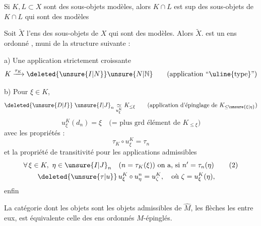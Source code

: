 Si $K,L\subset X$ sont des sous-objets modèles, alors $K\cap L$ est sup des sous-objets de $K\cap L$ qui sont des modèles

Soit  $\widetilde X$ l'ens des  sous-objets de $X$ qui sont des modèles. Alors $\widetilde X$. est un ens ordonné , muni de la structure suivante  : 

a)  Une application strictement croissante
\[
K\xrightarrow{\tau_K}\deleted{\unsure{I|N}}\unsure{N|\mathbb N}
\qquad\text{(application ``\uline{type}'')}
\]

b) Pour  $\xi\in K$,    
\[
\deleted{\unsure{D|I}}\;{\unsure{I|J}}_n\underset{u_\xi^K}{\simeq}K_{\leq\xi}
\qquad\text{(application d'épinglage de }K_{\leq\unsure{\xi|\eta}}\text{)}
\]
\[
u_\xi^K(d_n)=\xi\quad\text{(= plus grd élément de }K_{\leq\xi}\text{)}
\]
avec  les propriétés  :
\begingroup\makeatletter\tagsleft@true\makeatother
\[
\tau_K\circ u_\xi^K=\tau_n\tag*{(1)}
\]
et la propriété de transitivité pour les applications admissibles
\[
\begin{aligned}[t]
&\forall\,\xi\in K,\ \eta\in {\unsure{I|J}}_n\quad(n=\tau_K(\xi))\ \text{on a, si }n'=\tau_n(\eta)\\
&\qquad\deleted{\unsure{\tau|u}}\,u_\xi^K\circ u_\eta^n=u_\zeta^K,\quad\text{où }\zeta=u_\xi^K(\eta),
\end{aligned}\tag*{(2)}
\]
\endgroup
enfin


La catégorie dont les objets sont les objets admissibles de $\widehat M$, les flèches les  entre eux, est équivalente  celle des ens ordonnés $M$-épinglés.

